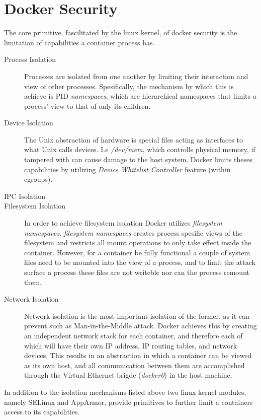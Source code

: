 \documentclass[USenglish]{uit-thesis}
\begin{document}
\section{Docker Security}
The core primitive, fascilitated by the linux kernel, of docker security is the limitation
of capabilities a container process has.

\begin{description}
    \item[Process Isolation] Processes are isolated from one another by limiting their
        interaction and view of other processes.
        Spesifically, the mechanism by which this is achieve is PID \textit{namespaces}, which
        are hierarchical namespaces that limits a process' view to that of only its children.
    \item[Device Isolation] The Unix abstraction of hardware is special files acting as interfaces to what Unix calls devices.
        I.e \textit{/dev/mem}, which controlls physical memory, if tampered with can cause damage to the host system.
        Docker limits theses capabilities by utilizing \textit{Device Whitelist Controller} feature (within cgroups).
    \item[IPC Isolation]
    \item[Filesystem Isolation]
        In order to achieve filesystem isolation Docker utilizes \textit{filesystem namespaces}.
        \textit{filesystem namespaces} creates process spesific views of the filesystem and
        restricts all mount operations to only take effect inside the container.
        However, for a container be fully functional a couple of system files need to be mounted
        into the view of a process, and to limit the attack surface a process these files are not
        writeble nor can the process remount them.
    \item[Network Isolation] Network isolation is the most important isolation of the former, as it can
        prevent such as Man-in-the-Middle attack.
        Docker achieves this by creating an independent network stack for each container, and therefore
        each of which will have their own IP address, IP routing tables, and network devices.
        This results in an abstraction in which a container can be viewed as its own host, and
        all communication between them are accomplished through the Virtual Ethernet brigde (\textit{docker0}) in the host machine.
\end{description}

In addition to the isolation mechanisms listed above two linux kernel modules, namely SELinux and AppArmor,  provide primitives to
further limit a containers access to its capabilities.
\end{document}
